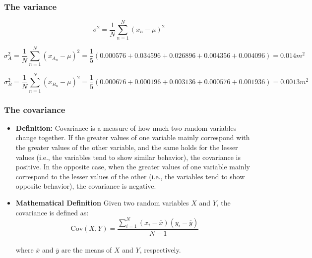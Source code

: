 \documentclass[aspectratio=169]{beamer}
\begin{document}
\begin{frame}
    \frametitle{The variance}

    \begin{equation*}
        \sigma^{2} = \frac{1}{N} \sum _{n=1}^{N} \left( x_{n} -  \mu  \right) ^{2}
    \end{equation*}

    \vspace{5mm}
    \scriptsize
    \begin{equation*}
        \sigma_{\scriptscriptstyle \!A}^{2} = \frac{1}{N} \sum _{n=1}^{N} \left( x_{\scriptscriptstyle \!A_{n}} -  \mu  \right) ^{2} = \frac{1}{5} \left( 0.000576+ 0.034596+ 0.026896+ 0.004356+ 0.004096 \right) = 0.014m^{2}
    \end{equation*}

    \vspace{1mm}

    \begin{equation*}
        \sigma_{\scriptscriptstyle \!B}^{2} = \frac{1}{N} \sum _{n=1}^{N} \left( x_{\scriptscriptstyle \!B_{n}} -  \mu  \right) ^{2} = \frac{1}{5} \left( 0.000676+ 0.000196+ 0.003136+ 0.000576+ 0.001936 \right) = 0.0013m^{2}
    \end{equation*}

\end{frame}

\begin{frame}
    \frametitle{The covariance}
    \footnotesize

    \begin{itemize}
        \item \textbf{Definition:}
              Covariance is a measure of how much two random variables change together. If the greater values of one variable mainly correspond with the greater values of the other variable, and the same holds for the lesser values (i.e., the variables tend to show similar behavior), the covariance is positive. In the opposite case, when the greater values of one variable mainly correspond to the lesser values of the other (i.e., the variables tend to show opposite behavior), the covariance is negative.
        \item \textbf{Mathematical Definition}
              Given two random variables \(X\) and \(Y\), the covariance is defined as:\\
              \[
                  \text{Cov}(X, Y) = \frac{\sum_{i=1}^{N} (x_{i} - \overline{x})(y_{i} - \overline{y})}{N - 1}
              \] \\
              where \(\overline{x}\) and \(\overline{y}\) are the means of \(X\) and \(Y\), respectively.
    \end{itemize}

\end{frame}
\end{document}
